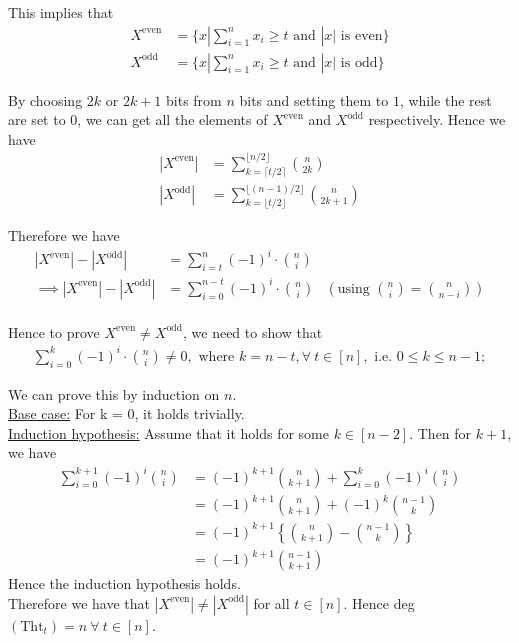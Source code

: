 \documentclass{article}
\begin{document}
\noindent
This implies that
\begin{align*}
	X^\text{even} &= \{x | \sum_{i=1}^n x_i \geq t \text{ and } |x| \text{ is even}\} \\
	X^\text{odd} &= \{x | \sum_{i=1}^n x_i \geq t \text{ and } |x| \text{ is odd}\}
\end{align*}

\noindent
By choosing $2k$ or $2k+1$ bits from $n$ bits and setting them to $1$, while the rest are set to $0$, we can get all the elements of $X^\text{even}$ and $X^\text{odd}$ respectively. Hence we have 
\begin{align*}
	|X^\text{even}| &= \sum_{k = \lceil t/2 \rceil}^{\lfloor n/2 \rfloor} {n \choose 2k} \\
	|X^\text{odd}| &= \sum_{k = \lfloor t/2 \rfloor}^{\lfloor (n-1)/2 \rfloor} {n \choose 2k+1}
\end{align*}

\noindent
Therefore we have
\begin{align*}
	|X^\text{even}| - |X^\text{odd}| &= \sum_{i = t}^n {(-1)^i \cdot {n \choose i}} \\
\implies |X^\text{even}| - |X^\text{odd}| &= \sum_{i = 0}^{n-t} {(-1)^i \cdot {n \choose i}} & (\text{using } {n \choose i} = {n \choose n-i}) \\
\end{align*}

\noindent
Hence to prove $X^\text{even} \neq X^\text{odd}$, we need to show that
\begin{align}
	\sum_{i = 0}^{k} {(-1)^i \cdot {n \choose i}} \neq 0, \text{ where } k = n- t, \forall\ t \in [n], \text{ i.e. } 0 \leq k \leq n - 1;
\end{align}

\noindent
We can prove this by induction on $n$. \\
\underline{Base case:} For k = 0, it holds trivially. \\
\underline{Induction hypothesis:} Assume that it holds for some $k \in [n-2]$. Then for $k+1$, we have
\begin{align*}
	\sum_{i=0}^{k+1}(-1)^i\binom{n}{i} &= (-1)^{k+1}\binom{n}{k+1}+\sum_{i=0}^{k}(-1)^i\binom{n}{i} \\
	&= (-1)^{k+1}\binom{n}{k+1}+(-1)^k\binom{n-1}{k} \\
	&= (-1)^{k+1}\left\{\binom{n}{k+1}-\binom{n-1}{k}\right\} \\
	&= (-1)^{k+1}\binom{n-1}{k+1}
\end{align*}
Hence the induction hypothesis holds. \\

\noindent
Therefore we have that $|X^\text{even}| \neq |X^\text{odd}|$ for all $t \in [n]$. Hence deg $(\text{Tht}_t) = n\ \forall\ t \in [n]$.
\end{document}
